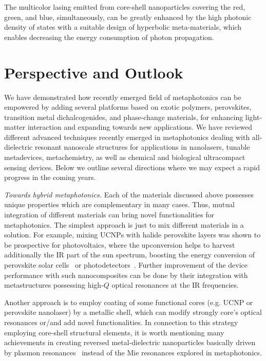 \documentclass[journal=chreay,manuscript=review]{achemso}
\begin{document}
The multicolor lasing emitted from core-shell nanoparticles covering the red, green, and blue, simultaneously, can be greatly enhanced by the high photonic density of states with a suitable design of hyperbolic meta-materials, which enables decreasing the energy consumption of photon propagation.


\section{Perspective and Outlook}

We have demonstrated how recently emerged field of metaphotonics can be empowered by adding several platforms based on exotic polymers, perovskites, transition metal dichalcogenides, and phase-change materials, for enhancing light-matter interaction and expanding towards new applications. We have reviewed different advanced techniques recently emerged in metaphotonics dealing with all-dielectric resonant nanoscale structures for applications in nanolasers, tunable metadevices, metachemistry, as well as chemical and biological ultracompact sensing devices. Below we outline several directions where we may expect a rapid progress in the coming years.

{\it Towards hybrid metaphotonics.} Each of the materials discussed above possesses unique properties which are complementary in many cases. Thus, mutual integration of different materials can bring novel functionalities for metaphotonics. The simplest approach is just to mix different materials in a solution. For example, mixing UCNPs with halide perovskite layers was shown to be prospective for photovoltaics, where the upconversion helps to harvest additionally the IR part of the sun spectrum, boosting the energy conversion of perovskite solar cells~\cite{he2016monodisperse} or photodetectors~\cite{zhang2017perovskite}. Further improvement of the device performance with such nanocomposites can be done by their integration with metastructures possessing high-$Q$ optical resonances at the IR frequencies. 

Another approach is to employ coating of some functional cores (e.g. UCNP or perovskite nanolaser) by a metallic shell, which can modify strongly  core's optical resonances or/and add novel functionalities. In connection to this strategy employing core-shell structural elements, it is worth mentioning many achievements in creating reversed metal-dielectric nanoparticles basically driven by plasmon resonances~\cite{volk,magnozzi} instead of the Mie resonances explored in metaphotonics. 
\end{document}
